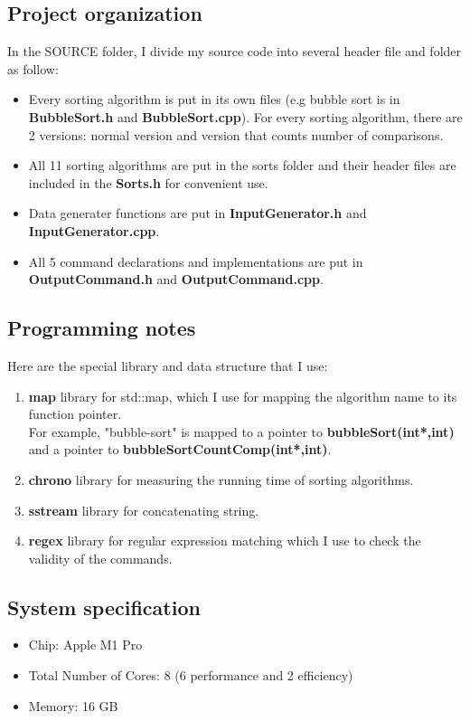 \documentclass[12pt]{article}
\begin{document}
\subsection{Project organization}
In the SOURCE folder, I divide my source code into several header file and folder as follow:
\begin{itemize}
    \item Every sorting algorithm is put in its own files (e.g bubble sort is in \textbf{BubbleSort.h} and \textbf{BubbleSort.cpp}). For every sorting algorithm, there are 2 versions: normal version and version that counts number of comparisons.
    \item All 11 sorting algorithms are put in the sorts folder and their header files are included in the \textbf{Sorts.h} for convenient use.
    \item Data generater functions are put in \textbf{InputGenerator.h} and \textbf{InputGenerator.cpp}.
    \item All 5 command declarations and implementations are put in \textbf{OutputCommand.h} and \textbf{OutputCommand.cpp}.
\end{itemize}
\subsection{Programming notes}
Here are the special library and data structure that I use:
\begin{enumerate}
    \item \textbf{map} library for std::map, which I use for mapping the algorithm name to its function pointer. 
    \\ For example, "bubble-sort" is mapped to a pointer to \textbf{bubbleSort(int*,int)} and a pointer to \textbf{bubbleSortCountComp(int*,int)}.
    \item \textbf{chrono} library for measuring the running time of sorting algorithms.
    \item \textbf{sstream} library for concatenating string.
    \item \textbf{regex} library for regular expression matching which I use to check the validity of the commands.
\end{enumerate}
\subsection{System specification}
\begin{itemize}
    \item Chip: Apple M1 Pro
    \item Total Number of Cores: 8 (6 performance and 2 efficiency)
    \item Memory: 16 GB
\end{itemize}
\end{document}
